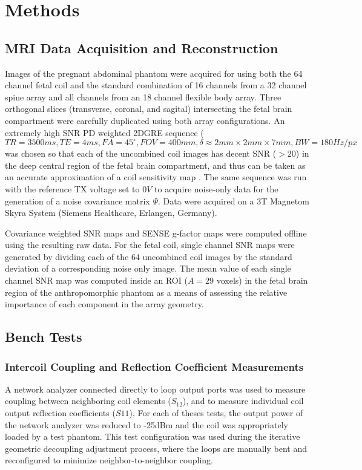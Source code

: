 \chapter{Methods}

\section{MRI Data Acquisition and Reconstruction}
Images of the pregnant abdominal phantom were acquired for using both the 64 channel fetal coil and the standard
combination of 16 channels from a 32 channel spine array and all channels from an 18 channel flexible body array. Three
orthogonal slices (transverse, coronal, and sagital) intersecting the fetal brain compartment were carefully duplicated
using both array configurations. An extremely high SNR PD weighted 2DGRE sequence ($TR=3500ms, TE=4ms, FA=45^{\circ},
FOV=400mm, \delta \approx 2mm \times 2mm \times 7mm, BW=180Hz/px$ was chosen so that each of the uncombined coil images
has decent SNR ($>20$) in the deep central region of the fetal brain compartment, and thus can be taken as an accurate
approximation of a coil sensitivity map \cite{Roemer90}. The same sequence was run with the reference TX voltage set to
$0V$ to acquire noise-only data for the generation of a noise covariance matrix $\Psi$. Data were acquired on a 3T
Magnetom Skyra System (Siemens Healthcare, Erlangen, Germany).

Covariance weighted SNR maps and SENSE g-factor maps were computed offline using the resulting raw data. For the fetal
coil, single channel SNR maps were generated by dividing each of the 64 uncombined coil images by the standard deviation
of a corresponding noise only image. The mean value of each single channel SNR map was computed inside an ROI ($A=29$
voxels) in the fetal brain region of the anthropomorphic phantom as a means of assessing the relative importance of each
component in the array geometry.

\section{Bench Tests}
\subsection{Intercoil Coupling and Reflection Coefficient Measurements}
A network analyzer connected directly to loop output ports was used to measure coupling between neighboring coil
elements ($S_{12}$), and to measure individual coil output reflection coefficients ($S{11}$). For each of theses tests,
the output power of the network analyzer was reduced to -25dBm and the coil was appropriately loaded by a test phantom.
This test configuration was used during the iterative geometric decoupling adjustment process, where the loops are
manually bent and reconfigured to minimize neighbor-to-neighbor coupling.

